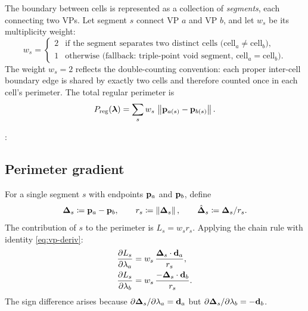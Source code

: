 \documentclass[11pt,a4paper]{article}
\begin{document}
The boundary between cells is represented as a collection of
\emph{segments}, each connecting two VPs.  Let segment $s$ connect VP $a$
and VP $b$, and let $w_s$ be its multiplicity weight:
\begin{equation}
  w_s = \begin{cases} 2 & \text{if the segment separates two distinct cells
                            ($\mathrm{cell}_a \neq \mathrm{cell}_b$),} \\
                       1 & \text{otherwise (fallback: triple-point void
                            segment, $\mathrm{cell}_a = \mathrm{cell}_b$).}
        \end{cases}
  \label{eq:weight}
\end{equation}
The weight $w_s = 2$ reflects the double-counting convention: each proper
inter-cell boundary edge is shared by exactly two cells and therefore
counted once in each cell's perimeter.  The total regular perimeter is
\begin{equation}
  P_{\mathrm{reg}}(\boldsymbol{\lambda})
    = \sum_s w_s\, \left\|\mathbf{p}_{a(s)} - \mathbf{p}_{b(s)}\right\|.
  \label{eq:perimeter}
\end{equation}

\begin{tcolorbox}[colback=blue!4!white, colframe=blue!40!black,
                  title={Code: regular perimeter value}, fontupper=\small]
: 
\end{tcolorbox}

\subsection{Perimeter gradient}
\label{sec:perimeter-gradient}

For a single segment $s$ with endpoints $\mathbf{p}_{a}$ and $\mathbf{p}_{b}$, define
\begin{equation}
  \boldsymbol{\Delta}_s \coloneqq \mathbf{p}_{a} - \mathbf{p}_{b}, \qquad
  r_s \coloneqq \left\|\boldsymbol{\Delta}_s\right\|, \qquad
  \hat{\boldsymbol{\Delta}}_s \coloneqq \boldsymbol{\Delta}_s / r_s.
\end{equation}
The contribution of $s$ to the perimeter is $L_s = w_s r_s$.  Applying the
chain rule with identity \eqref{eq:vp-deriv}:
\begin{align}
  \dfrac{\partial L_s}{\partial \lambda_a}
    &= w_s \, \frac{\boldsymbol{\Delta}_s \cdot \mathbf{d}_{a}}{r_s},
  \label{eq:dL-da} \\
  \dfrac{\partial L_s}{\partial \lambda_b}
    &= w_s \, \frac{-\boldsymbol{\Delta}_s \cdot \mathbf{d}_{b}}{r_s}.
  \label{eq:dL-db}
\end{align}
The sign difference arises because $\partial\boldsymbol{\Delta}_s/\partial\lambda_a =
\mathbf{d}_{a}$ but $\partial\boldsymbol{\Delta}_s/\partial\lambda_b = -\mathbf{d}_{b}$.
\end{document}
